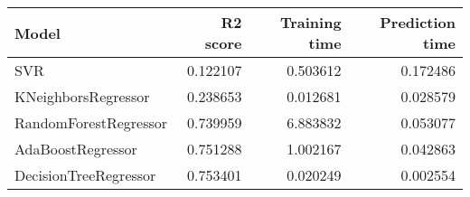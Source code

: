 \begin{tabular}{lrrr}
\toprule
Model & R2 score & Training time & Prediction time \\
\midrule
SVR & 0.122107 & 0.503612 & 0.172486 \\
KNeighborsRegressor & 0.238653 & 0.012681 & 0.028579 \\
RandomForestRegressor & 0.739959 & 6.883832 & 0.053077 \\
AdaBoostRegressor & 0.751288 & 1.002167 & 0.042863 \\
DecisionTreeRegressor & 0.753401 & 0.020249 & 0.002554 \\
\bottomrule
\end{tabular}
